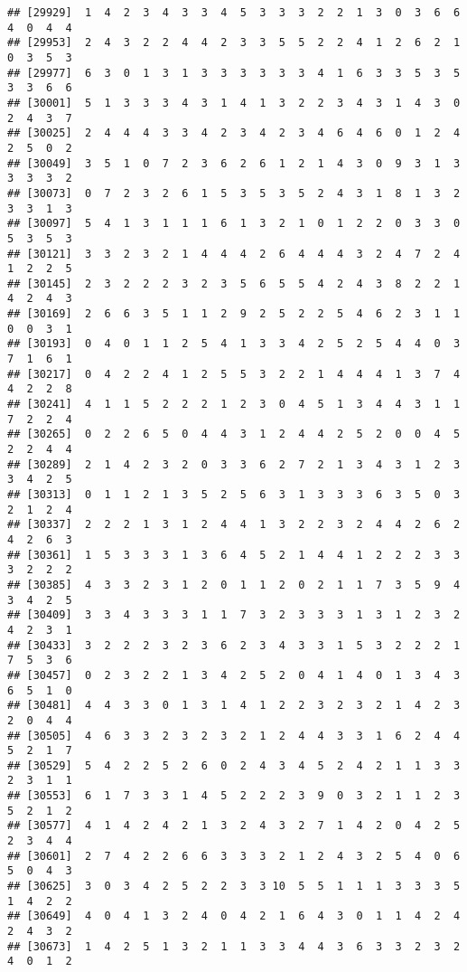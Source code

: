 \documentclass[
]{article}
\begin{document}
\begin{verbatim}
## [29929]  1  4  2  3  4  3  3  4  5  3  3  3  2  2  1  3  0  3  6  6  4  0  4  4
## [29953]  2  4  3  2  2  4  4  2  3  3  5  5  2  2  4  1  2  6  2  1  0  3  5  3
## [29977]  6  3  0  1  3  1  3  3  3  3  3  3  4  1  6  3  3  5  3  5  3  3  6  6
## [30001]  5  1  3  3  3  4  3  1  4  1  3  2  2  3  4  3  1  4  3  0  2  4  3  7
## [30025]  2  4  4  4  3  3  4  2  3  4  2  3  4  6  4  6  0  1  2  4  2  5  0  2
## [30049]  3  5  1  0  7  2  3  6  2  6  1  2  1  4  3  0  9  3  1  3  3  3  3  2
## [30073]  0  7  2  3  2  6  1  5  3  5  3  5  2  4  3  1  8  1  3  2  3  3  1  3
## [30097]  5  4  1  3  1  1  1  6  1  3  2  1  0  1  2  2  0  3  3  0  5  3  5  3
## [30121]  3  3  2  3  2  1  4  4  4  2  6  4  4  4  3  2  4  7  2  4  1  2  2  5
## [30145]  2  3  2  2  2  3  2  3  5  6  5  5  4  2  4  3  8  2  2  1  4  2  4  3
## [30169]  2  6  6  3  5  1  1  2  9  2  5  2  2  5  4  6  2  3  1  1  0  0  3  1
## [30193]  0  4  0  1  1  2  5  4  1  3  3  4  2  5  2  5  4  4  0  3  7  1  6  1
## [30217]  0  4  2  2  4  1  2  5  5  3  2  2  1  4  4  4  1  3  7  4  4  2  2  8
## [30241]  4  1  1  5  2  2  2  1  2  3  0  4  5  1  3  4  4  3  1  1  7  2  2  4
## [30265]  0  2  2  6  5  0  4  4  3  1  2  4  4  2  5  2  0  0  4  5  2  2  4  4
## [30289]  2  1  4  2  3  2  0  3  3  6  2  7  2  1  3  4  3  1  2  3  3  4  2  5
## [30313]  0  1  1  2  1  3  5  2  5  6  3  1  3  3  3  6  3  5  0  3  2  1  2  4
## [30337]  2  2  2  1  3  1  2  4  4  1  3  2  2  3  2  4  4  2  6  2  4  2  6  3
## [30361]  1  5  3  3  3  1  3  6  4  5  2  1  4  4  1  2  2  2  3  3  3  2  2  2
## [30385]  4  3  3  2  3  1  2  0  1  1  2  0  2  1  1  7  3  5  9  4  3  4  2  5
## [30409]  3  3  4  3  3  3  1  1  7  3  2  3  3  3  1  3  1  2  3  2  4  2  3  1
## [30433]  3  2  2  2  3  2  3  6  2  3  4  3  3  1  5  3  2  2  2  1  7  5  3  6
## [30457]  0  2  3  2  2  1  3  4  2  5  2  0  4  1  4  0  1  3  4  3  6  5  1  0
## [30481]  4  4  3  3  0  1  3  1  4  1  2  2  3  2  3  2  1  4  2  3  2  0  4  4
## [30505]  4  6  3  3  2  3  2  3  2  1  2  4  4  3  3  1  6  2  4  4  5  2  1  7
## [30529]  5  4  2  2  5  2  6  0  2  4  3  4  5  2  4  2  1  1  3  3  2  3  1  1
## [30553]  6  1  7  3  3  1  4  5  2  2  2  3  9  0  3  2  1  1  2  3  5  2  1  2
## [30577]  4  1  4  2  4  2  1  3  2  4  3  2  7  1  4  2  0  4  2  5  2  3  4  4
## [30601]  2  7  4  2  2  6  6  3  3  3  2  1  2  4  3  2  5  4  0  6  5  0  4  3
## [30625]  3  0  3  4  2  5  2  2  3  3 10  5  5  1  1  1  3  3  3  5  1  4  2  2
## [30649]  4  0  4  1  3  2  4  0  4  2  1  6  4  3  0  1  1  4  2  4  2  4  3  2
## [30673]  1  4  2  5  1  3  2  1  1  3  3  4  4  3  6  3  3  2  3  2  4  0  1  2

\end{verbatim}
\end{document}

